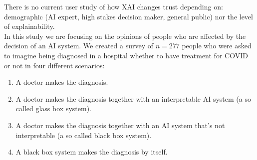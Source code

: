 \documentclass[manuscript,screen,review]{acmart}
\begin{document}
There is no current user study of how XAI changes trust depending on: demographic (AI expert, high stakes decision maker, general public) nor the level of explainability.\\  

In this study we are focusing on the opinions of people who are affected by the decision of an AI system. We created a survey of $n=277$ people who were asked to imagine being diagnosed in a hospital whether to have treatment for COVID or not in four different scenarios:

\begin{enumerate}
    \item A doctor makes the diagnosis.
    \item A doctor makes the diagnosis together with an interpretable AI system (a so called glass box system).
    \item A doctor makes the diagnosis together with an AI system that’s not interpretable (a so called black box system).
    \item A black box system makes the diagnosis by itself.
\end{enumerate}
\end{document}
